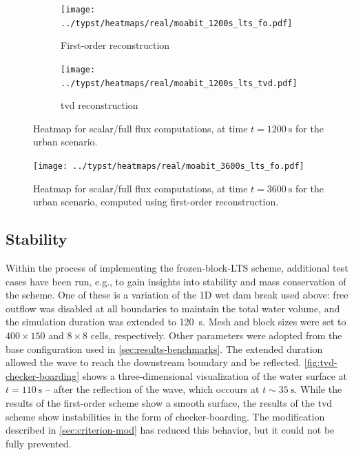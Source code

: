 \begin{figure} [p]
  \centering
  \begin{subfigure}[t]{0.45\textwidth}
    \centering
    \texttt{[image: ../typst/heatmaps/real/moabit\_1200s\_lts\_fo.pdf]}
    \caption{
      First-order reconstruction
    }
    \label{fig:heatmap-moabit-1200s-fo}
  \end{subfigure}
  \hspace{0.5cm}
  \begin{subfigure}[t]{0.45\textwidth}
    \centering
    \texttt{[image: ../typst/heatmaps/real/moabit\_1200s\_lts\_tvd.pdf]}
    \caption{
      \acrshort{tvd} reconstruction
    }
    \label{fig:heatmap-moabit-1200s-tvd}

  \end{subfigure}
  \caption{
    Heatmap for scalar/full flux computations, at time $t = \SI{1200}{\second}$ for the urban scenario.
    }
  \label{fig:heatmap-moabit-1200s}
\end{figure}

\begin{figure} [p]
  \centering
  \texttt{[image: ../typst/heatmaps/real/moabit\_3600s\_lts\_fo.pdf]}
  \caption{
    Heatmap for scalar/full flux computations, at time $t = \SI{3600}{\second}$ for the urban scenario, computed using first-order reconstruction.
  }
  \label{fig:heatmap-moabit-3600s}
\end{figure}

\FloatBarrier
\newpage
\FloatBarrier
\subsection{Stability}\label{sec:results-ugly}

Within the process of implementing the \gls{frozen-block-LTS} scheme, additional test cases have been run, e.g., to gain insights into stability and mass conservation of the scheme.
One of these is a variation of the \gls{1D} wet dam break used above:
free outflow was disabled at all boundaries to maintain 
the total water volume, 
and the simulation duration was extended to \SI{120}{\second}.
Mesh and block sizes were set to $400 \times 150$ and $8 \times 8$ cells, respectively.
Other parameters were adopted from the base configuration used in \autoref{sec:results-benchmarks}.
The extended duration allowed the wave to reach the downstream boundary and be reflected.
\autoref{fig:tvd-checker-boarding} shows a three-dimensional visualization of the water surface at $t=\SI{110}{\second}$ -- after the reflection of the wave, which occours at $t\sim\SI{35}{\second}$.
While the results of the first-order scheme show a smooth surface, the results of the \gls{tvd} scheme show instabilities in the form of checker-boarding.
The modification described in \autoref{sec:criterion-mod} has reduced this behavior, but it could not be fully prevented.

